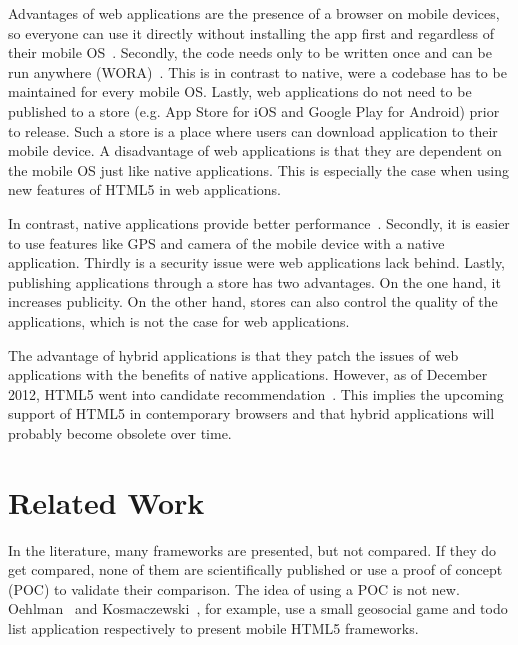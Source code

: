 \documentclass[a4paper]{artikel3}
\begin{document}
Advantages of web applications are the presence of a browser on mobile devices, so everyone can use it directly without installing the app first and regardless of their mobile OS~\cite{Accenture2012}.
Secondly, the code needs only to be written once and can be run anywhere (WORA)~\cite{Hales2012}.
This is in contrast to native, were a codebase has to be maintained for every mobile OS.
Lastly, web applications do not need to be published to a store (e.g. App Store for iOS and Google Play for Android) prior to release.
Such a store is a place where users can download application to their mobile device.
A disadvantage of web applications is that they are dependent on the mobile OS just like native applications.
This is especially the case when using new features of HTML5 in web applications.

In contrast, native applications provide better performance~\cite{Accenture2012}.
Secondly, it is easier to use features like GPS and camera of the mobile device with a native application.
Thirdly is a security issue were web applications lack behind. 
Lastly, publishing applications through a store has two advantages.
On the one hand, it increases publicity.
On the other hand, stores can also control the quality of the applications, which is not the case for web applications.

The advantage of hybrid applications is that they patch the issues of web applications with the benefits of native applications.
However, as of December 2012, HTML5 went into candidate recommendation~\cite{Jacobs2012}.
This implies the upcoming support of HTML5 in contemporary browsers and that hybrid applications will probably become obsolete over time.


\section{Related Work} %
\label{sec:related-work}

In the literature, many frameworks are presented, but not compared.
If they do get compared, none of them are scientifically published or use a proof of concept (POC) to validate their comparison.  
The idea of using a POC is not new.  
Oehlman~\cite{Oeflman2011} and Kosmaczewski~\cite{Kosmaczewski2012},  for example,  use a small geosocial game and todo list application respectively to present mobile HTML5 frameworks.
\end{document}
